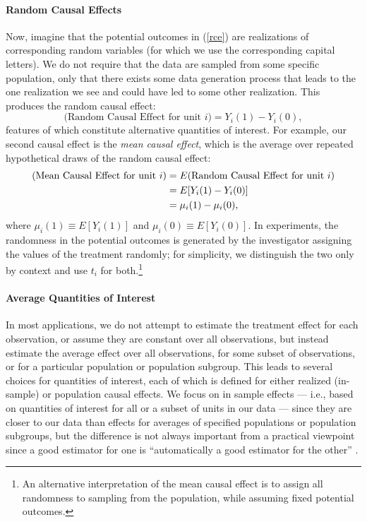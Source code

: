 \documentclass[11pt,titlepage]{article}
\begin{document}
\paragraph{Random Causal Effects} 
Now, imagine that the potential outcomes in (\ref{rce}) are
realizations of corresponding random variables (for which we use the
corresponding capital letters).  We do not require that the data are
sampled from some specific population, only that there exists some
data generation process that leads to the one realization we see and
could have led to some other realization.  This produces the random
causal effect:
\begin{equation}
  \label{rance}
  \text{(Random Causal Effect for unit $i$)}  = Y_i(1) - Y_i(0),
\end{equation}
features of which constitute alternative quantities of interest.  For
example, our second causal effect is the \emph{mean causal effect},
which is the average over repeated hypothetical draws of the random
causal effect:
\begin{align}
  \label{meance} \text{(Mean Causal Effect for unit $i$)}
  &= E(\text{Random Causal Effect for unit $i$})\\
  &= E[Y_i(1) - Y_i(0)]\\ \notag &= \mu_i(1) - \mu_i(0),
\end{align}
where $\mu_i(1)\equiv E[Y_i(1)]$ and $\mu_i(0)\equiv E[Y_i(0)]$.  In
experiments, the randomness in the potential outcomes is generated by
the investigator assigning the values of the treatment randomly; for
simplicity, we distinguish the two only by context and use $t_i$ for
both.\footnote{An alternative interpretation of the mean causal effect
  is to assign all randomness to sampling from the population, while
  assuming fixed potential outcomes.}

\paragraph{Average Quantities of Interest}
In most applications, we do not attempt to estimate the treatment
effect for each observation, or assume they are constant over all
observations, but instead estimate the average effect over all
observations, for some subset of observations, or for a particular
population or population subgroup.  This leads to several choices for
quantities of interest, each of which is defined for either realized
(in-sample) or population causal effects.  We focus on in sample
effects --- i.e., based on quantities of interest for all or a subset
of units in our data --- since they are closer to our data than
effects for averages of specified populations or population subgroups,
but the difference is not always important from a practical viewpoint
since a good estimator for one is ``automatically a good estimator for
the other'' \citep[p.6]{Imbens04}.
\end{document}
